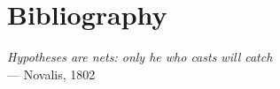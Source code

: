 

%
{} %
\chapter*{Bibliography}

\begin{flushright}{\slshape
    Hypotheses are nets: only he who casts will catch} \\ \medskip
    --- Novalis, 1802
\end{flushright}

\printbibliography[
heading=none
]

%
\manualmark
\markboth{\spacedlowsmallcaps{\bibname}}{\spacedlowsmallcaps{\bibname}}
%
